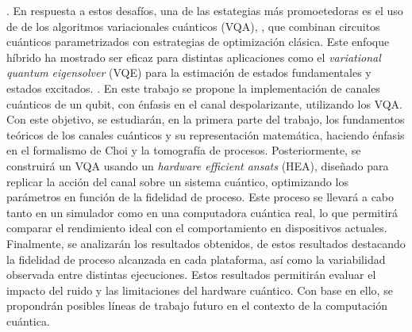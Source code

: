 \documentclass[letterpaper,12pt]{thesisECFM}
\theoremstyle{plain}
\theoremstyle{definition}
\theoremstyle{definition}
\theoremstyle{remark}
\newcommand{\1}{\mathbb{1}}
\begin{document}
 . En respuesta a estos desafíos, una de las estategias más promoetedoras es el uso de de los algoritmos variacionales cuánticos (VQA),   , que combinan circuitos cuánticos parametrizados con estrategias de optimización clásica. Este enfoque híbrido ha mostrado ser eficaz para distintas aplicaciones como el \textit{variational quantum eigensolver} (VQE) para la estimación de estados fundamentales y estados excitados. \cite{VQA} .  En este trabajo se propone la implementación de canales cuánticos de un qubit, con énfasis en el canal despolarizante, utilizando los VQA. Con este objetivo, se estudiarán, en la primera parte del trabajo, los fundamentos teóricos de los canales cuánticos y su representación matemática, haciendo énfasis en el formalismo de Choi y la tomografía de procesos.  Posteriormente, se construirá un VQA usando un \textit{hardware efficient ansats} (HEA), diseñado para replicar la acción del canal sobre un sistema cuántico, optimizando los parámetros en función de la fidelidad de proceso. Este proceso se llevará a cabo tanto en un simulador como en una computadora cuántica real, lo que permitirá comparar el rendimiento ideal con el comportamiento en dispositivos actuales. Finalmente, se analizarán los resultados obtenidos,   de estos resultados   destacando la fidelidad de proceso alcanzada en cada plataforma, así como la variabilidad observada entre distintas ejecuciones. Estos resultados permitirán evaluar el impacto del ruido y las limitaciones del hardware cuántico. Con base en ello, se propondrán posibles líneas de trabajo futuro en el contexto de la computación cuántica.
\end{document}
